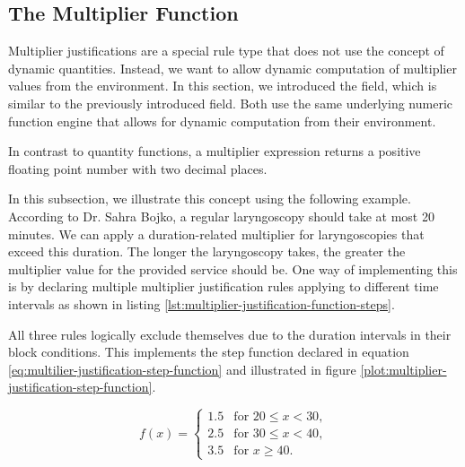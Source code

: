 \subsection{The Multiplier Function}\label{subsec:the-multiplier-function}
Multiplier justifications are a special rule type that does not use the concept of dynamic quantities.
Instead, we want to allow dynamic computation of multiplier values from the environment.
In this section, we introduced the  field, which is similar to the previously introduced  field.
Both use the same underlying numeric function engine that allows for dynamic computation from their environment.

In contrast to quantity functions, a multiplier expression returns a positive floating point number with two decimal places.

In this subsection, we illustrate this concept using the following example.
According to Dr. Sahra Bojko, a regular laryngoscopy should take at most 20 minutes.
We can apply a duration-related multiplier for laryngoscopies that exceed this duration.
The longer the laryngoscopy takes, the greater the multiplier value for the provided service should be.
One way of implementing this is by declaring multiple multiplier justification rules applying to different time intervals as shown in listing \ref{lst:multiplier-justification-function-steps}.

\clearpage

All three rules logically exclude themselves due to the duration intervals in their  block conditions.
This implements the step function declared in equation \ref{eq:multilier-justification-step-function} and illustrated in figure \ref{plot:multiplier-justification-step-function}.

\begin{equation}\label{eq:multilier-justification-step-function}
    f(x) =
    \begin{cases}
        1.5 & \text{for } 20 \leq x < 30, \\
        2.5 & \text{for } 30 \leq x < 40, \\
        3.5 & \text{for } x \geq 40.
    \end{cases}
\end{equation}

